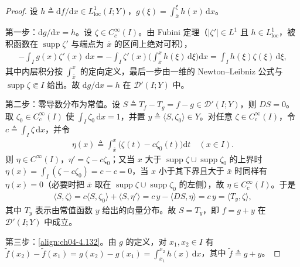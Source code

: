 \documentclass[../../main.tex]{subfiles}%
\begin{document}
\begin{proof}
设 $h\triangleq\mathrm{d}f/\mathrm{d}x\in L^1_{\mathrm{loc}}(I;Y)$，$g(\xi)=\int_{\bar x}^{\xi}h(x)\,\mathrm{d}x$。

第一步：$\mathrm{d}g/\mathrm{d}x=h$。设 $\zeta\in C_c^\infty(I)$。由 Fubini 定理（$|\zeta'|\in L^1$ 且 $h\in L^1_{\mathrm{loc}}$，被积函数在 $\operatorname{supp}\zeta'$ 与端点为 $\bar x$ 的区间上绝对可积），
\begin{align*}
-\int_Ig(x)\zeta'(x)\,\mathrm{d}x=-\int_I\zeta'(x)\Big(\int_{\bar x}^{x}h(\xi)\,\mathrm{d}\xi\Big)\mathrm{d}x=\int_Ih(\xi)\zeta(\xi)\,\mathrm{d}\xi ,
\end{align*}
其中内层积分按 $\int_{\bar x}^{x}$ 的定向定义，最后一步由一维的 Newton--Leibniz 公式与 $\operatorname{supp}\zeta\Subset I$ 给出。故 $\mathrm{d}g/\mathrm{d}x=h$ 在 $\mathcal{D}'(I;Y)$ 中。

第二步：零导数分布为常值。设 $S\triangleq T_f-T_g=f-g\in\mathcal{D}'(I;Y)$，则 $DS=0$。取 $\zeta_0\in C_c^\infty(I)$ 使 $\int_I\zeta_0\,\mathrm{d}x=1$，并置 $y\triangleq\langle S,\zeta_0\rangle\in Y$。对任意 $\zeta\in C_c^\infty(I)$，令 $c\triangleq\int_I\zeta\,\mathrm{d}x$，并令
\begin{align*}
\eta(x)\triangleq\int_{\bar x}^{x}\big(\zeta(t)-c\zeta_0(t)\big)\mathrm{d}t\quad(x\in I).
\end{align*}
则 $\eta\in C^\infty(I)$，$\eta'=\zeta-c\zeta_0$；又当 $x$ 大于 $\operatorname{supp}\zeta\cup\operatorname{supp}\zeta_0$ 的上界时 $\eta(x)=\int_I(\zeta-c\zeta_0)=c-c=0$，当 $x$ 小于其下界且大于 $\bar x$ 时同样有 $\eta(x)=0$（必要时把 $\bar x$ 取在 $\operatorname{supp}\zeta\cup\operatorname{supp}\zeta_0$ 的左侧），故 $\eta\in C_c^\infty(I)$。于是
\begin{align*}
\langle S,\zeta\rangle=c\langle S,\zeta_0\rangle+\langle S,\eta'\rangle=c\,y-\langle DS,\eta\rangle=c\,y=\Big\langle T_y,\zeta\Big\rangle ,
\end{align*}
其中 $T_y$ 表示由常值函数 $y$ 给出的向量分布。故 $S=T_y$，即 $f=g+y$ 在 $\mathcal{D}'(I;Y)$ 中成立。

第三步：\eqref{align:ch04-4.132}。由 $g$ 的定义，对 $x_1,x_2\in I$ 有 $\tilde f(x_2)-\tilde f(x_1)=g(x_2)-g(x_1)=\int_{x_1}^{x_2}h(x)\,\mathrm{d}x$，其中 $\tilde f\triangleq g+y$。
\end{proof}
\end{document}
